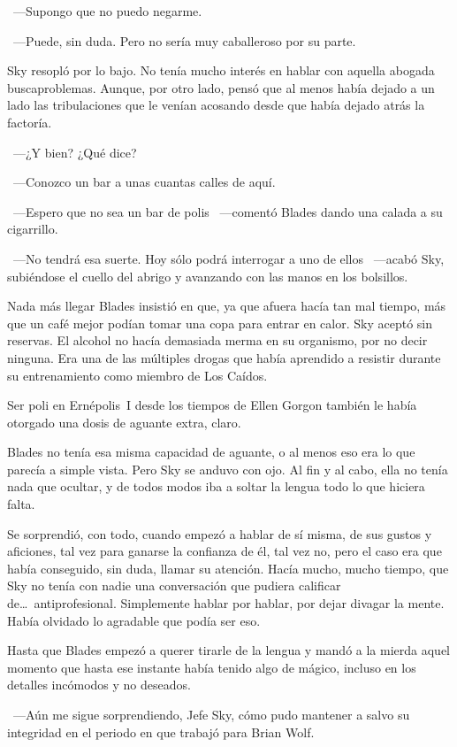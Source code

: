 ~---Supongo que no puedo negarme.

~---Puede, sin duda. Pero no sería muy caballeroso por su parte.

Sky resopló por lo bajo. No tenía mucho interés en hablar con aquella abogada buscaproblemas. Aunque, por otro lado, pensó que al menos había dejado a un lado las tribulaciones que le venían acosando desde que había dejado atrás la factoría.

~---¿Y bien? ¿Qué dice?

~---Conozco un bar a unas cuantas calles de aquí.

~---Espero que no sea un bar de polis ~---comentó Blades dando una calada a su cigarrillo.

~---No tendrá esa suerte. Hoy sólo podrá interrogar a uno de ellos ~---acabó Sky, subiéndose el cuello del abrigo y avanzando con las manos en los bolsillos.

\parbreak
Nada más llegar Blades insistió en que, ya que afuera hacía tan mal tiempo, más que un café mejor podían tomar una copa para entrar en calor. Sky aceptó sin reservas. El alcohol no hacía demasiada merma en su organismo, por no decir ninguna. Era una de las múltiples drogas que había aprendido a resistir durante su entrenamiento como miembro de Los Caídos.

Ser poli en Ernépolis~I desde los tiempos de Ellen Gorgon también le había otorgado una dosis de aguante extra, claro.

Blades no tenía esa misma capacidad de aguante, o al menos eso era lo que parecía a simple vista. Pero Sky se anduvo con ojo. Al fin y al cabo, ella no tenía nada que ocultar, y de todos modos iba a soltar la lengua todo lo que hiciera falta.

Se sorprendió, con todo, cuando empezó a hablar de sí misma, de sus gustos y aficiones, tal vez para ganarse la confianza de él, tal vez no, pero el caso era que había conseguido, sin duda, llamar su atención. Hacía mucho, mucho tiempo, que Sky no tenía con nadie una conversación que pudiera calificar de\dots\ antiprofesional. Simplemente hablar por hablar, por dejar divagar la mente. Había olvidado lo agradable que podía ser eso.

Hasta que Blades empezó a querer tirarle de la lengua y mandó a la mierda aquel momento que hasta ese instante había tenido algo de mágico, incluso en los detalles incómodos y no deseados.

~---Aún me sigue sorprendiendo, Jefe Sky, cómo pudo mantener a salvo su integridad en el periodo en que trabajó para Brian Wolf.

